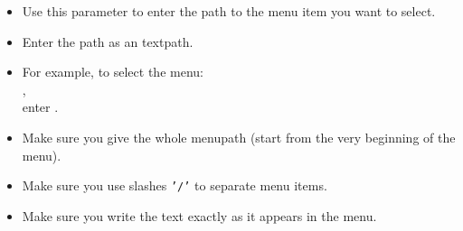 \begin{itemize}
\item Use this parameter to enter the path to the menu item you want to select.
\item Enter the path as an textpath.
\item For example, to select the menu:\\ ,\\ enter .
\item Make sure you give the whole menupath (start from the very beginning of the menu).
\item Make sure you use slashes {\tt '/'} to separate menu items.
\item Make sure you write the text exactly as it appears in the menu.
 
\end{itemize}

    
    